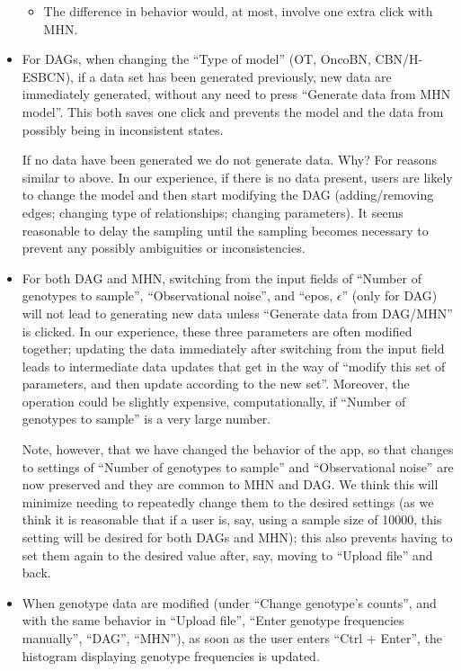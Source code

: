 \documentclass[a4paper,11pt]{article}
\begin{document}
\begin{itemize}
\begin{itemize}
  \item The difference in behavior would, at most, involve one extra click with MHN.
  \end{itemize}


\item For DAGs, when changing the ``Type of model'' (OT, OncoBN, CBN/H-ESBCN), if a data set has been generated previously, new data are immediately generated, without any need to press ``Generate data from MHN model''. This both saves one click and prevents the model and the data from possibly being in inconsistent states.

  If no data have been generated we do not generate data. Why? For reasons similar to above. In our experience, if there is no data present, users are likely to change the model and then start modifying the DAG (adding/removing edges; changing type of relationships; changing parameters). It seems reasonable to delay the sampling until the sampling becomes necessary to prevent any possibly ambiguities or inconsistencies.

  
\item For both DAG and MHN, switching from the input fields of ``Number of genotypes to sample'', ``Observational noise'', and ``epos, $\epsilon$'' (only for DAG) will not lead to generating new data unless ``Generate data from DAG/MHN'' is clicked. In our experience, these three parameters are often modified together; updating the data immediately after switching from the input field leads to intermediate data updates that get in the way of ``modify this set of parameters, and then update according to the new set''. Moreover, the operation could be slightly expensive, computationally, if ``Number of genotypes to sample'' is a very large number.
  

Note, however, that we have changed the behavior of the app, so that changes to settings of ``Number of genotypes to sample'' and ``Observational noise'' are now preserved and they are common to MHN and DAG. We think this will minimize needing to repeatedly change them to the desired settings (as we think it is reasonable that if a user is, say, using a sample size of 10000, this setting will be desired for both DAGs and MHN); this also prevents having to set them again to the desired value after, say, moving to ``Upload file'' and back.

  
\item When genotype data are modified (under ``Change genotype's counts'', and with the same behavior in ``Upload file'', ``Enter genotype frequencies manually'', ``DAG'', ``MHN''), as soon as the user enters ``Ctrl + Enter'', the histogram displaying genotype frequencies is updated.


\end{itemize}
\end{document}
